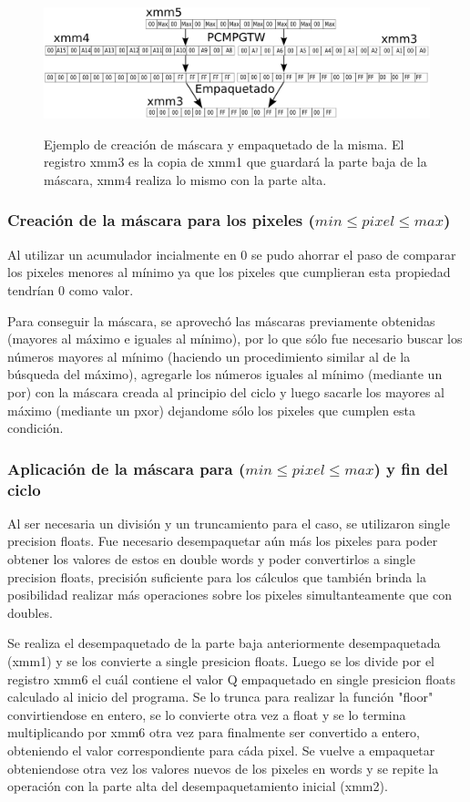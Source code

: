 \begin{figure}[H]
\centering
\includegraphics[width=150mm, height=40mm]{cpmmax.png}
\caption{Ejemplo de creación de máscara y empaquetado de la misma. El registro xmm3 es la copia de xmm1 que guardará la parte baja de la máscara, xmm4 realiza lo mismo con la parte alta.}
\label{overflow}
\end{figure}

\subsubsection{Creación de la máscara para los pixeles ($min \leq pixel \leq max$)}
Al utilizar un acumulador incialmente en 0 se pudo ahorrar el paso de comparar los pixeles menores al mínimo ya que los pixeles que cumplieran esta propiedad tendrían 0 como valor.

Para conseguir la máscara, se aprovechó las máscaras previamente obtenidas (mayores al máximo e iguales al mínimo), por lo que sólo fue necesario buscar los números mayores al mínimo (haciendo un procedimiento similar al de la búsqueda del máximo), agregarle los números iguales al mínimo (mediante un por) con la máscara creada al principio del ciclo y luego sacarle los mayores al máximo (mediante un pxor) dejandome sólo los pixeles que cumplen esta condición.

\subsubsection{Aplicación de la máscara para ($min \leq pixel \leq max$) y fin del ciclo}
Al ser necesaria un división y un truncamiento para el caso, se utilizaron single precision floats.
Fue necesario desempaquetar aún más los pixeles para poder obtener los valores de estos en double words y poder convertirlos a single precision floats, precisión suficiente para los cálculos que también brinda la posibilidad realizar más operaciones sobre los pixeles simultanteamente que con doubles.

Se realiza el desempaquetado de la parte baja anteriormente desempaquetada (xmm1) y se los convierte a single presicion floats. Luego se los divide por el registro xmm6 el cuál contiene el valor Q empaquetado en single presicion floats calculado al inicio del programa. Se lo trunca para realizar la función "floor" convirtiendose en entero, se lo convierte otra vez a float y se lo termina multiplicando por xmm6 otra vez para finalmente ser convertido a entero, obteniendo el valor correspondiente para cáda pixel. Se vuelve a empaquetar obteniendose otra vez los valores nuevos de los pixeles en words y se repite la operación con la parte alta del desempaquetamiento inicial (xmm2).

